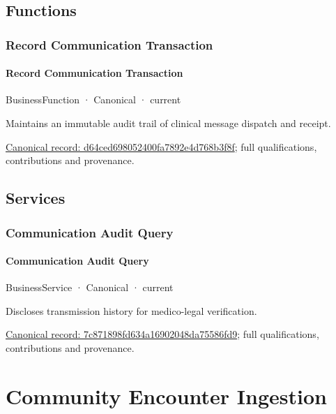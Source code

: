 \subsection{Functions}

\subsubsection{Record Communication Transaction}

\paragraph{Record Communication Transaction}

\label{element:d64ced698052400fa7892e4d768b3f8f}
{\small BusinessFunction · Canonical · current}\par

Maintains an immutable audit trail of clinical message dispatch and receipt.


{\footnotesize \href{../../../../continuum/business/business-function/d64ced698052400fa7892e4d768b3f8f.md}{Canonical record: d64ced698052400fa7892e4d768b3f8f}; full qualifications, contributions and provenance.}\par
\subsection{Services}

\subsubsection{Communication Audit Query}

\paragraph{Communication Audit Query}

\label{element:7c871898fd634a16902048da75586fd9}
{\small BusinessService · Canonical · current}\par

Discloses transmission history for medico-legal verification.


{\footnotesize \href{../../../../continuum/business/business-service/7c871898fd634a16902048da75586fd9.md}{Canonical record: 7c871898fd634a16902048da75586fd9}; full qualifications, contributions and provenance.}\par
\section{Community Encounter Ingestion}

